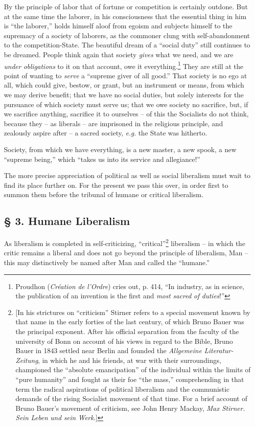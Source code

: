 By the principle of labor that of fortune or competition is certainly outdone. 
But at the same time the laborer, in his consciousness that the essential 
thing in him is ``the laborer,'' holds himself aloof from egoism and 
subjects himself to the supremacy of a society of laborers, as the commoner 
clung with self-abandonment to the competition-State. The beautiful dream of a 
``social duty'' still continues to be dreamed. People think again that 
society \textit{gives} what we need, and we are \textit{under obligations} to 
it on that account, owe it everything.\footnote{Proudhon (\textit{Cr\'eation 
de l'Ordre}) cries out, p. 414, ``In industry, as in science, the publication 
of an invention is the first and \textit{most sacred of duties}!''} They are 
still at the point of wanting to \textit{serve} a ``supreme giver of all 
good.'' That society is no ego at all, which could give, bestow, or grant, 
but an instrument or means, from which we may derive benefit; that we have no 
social duties, but solely interests for the pursuance of which society must 
serve us; that we owe society no sacrifice, but, if we sacrifice anything, 
sacrifice it to ourselves -- of this the Socialists do not think, because they 
-- as liberals -- are imprisoned in the religious principle, and zealously 
aspire after -- a sacred society, \textit{e.g.} the State was hitherto.

Society, from which we have everything, is a new master, a new spook, a new 
``supreme being,'' which ``takes us into its service and allegiance!''

The more precise appreciation of political as well as social liberalism must 
wait to find its place further on. For the present we pass this over, in order 
first to summon them before the tribunal of humane or critical liberalism.

\subsection[\S{} 3. Humane Liberalism]{\centering \S{} 3. Humane Liberalism}

As liberalism is completed in self-criticizing, ``critical''\footnote{[In 
his strictures on ``criticism'' Stirner refers to a special movement known 
by that name in the early forties of the last century, of which Bruno Bauer 
was the principal exponent. After his official separation from the faculty of 
the university of Bonn on account of his views in regard to the Bible, Bruno 
Bauer in 1843 settled near Berlin and founded the \textit{Allgemeine 
Literatur-Zeitung}, in which he and his friends, at war with their 
surroundings, championed the ``absolute emancipation'' of the individual 
within the limits of ``pure humanity'' and fought as their foe ``the 
mass,'' comprehending in that term the radical aspirations of political 
liberalism and the communistic demands of the rising Socialist movement of 
that time. For a brief account of Bruno Bauer's movement of criticism, see 
John Henry Mackay, \textit{Max Stirner. Sein Leben und sein Werk}.]} 
liberalism -- in which the critic remains a liberal and does not go beyond the 
principle of liberalism, Man -- this may distinctively be named after Man and 
called the ``humane.''

